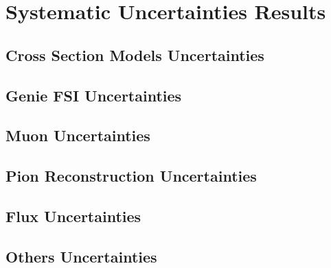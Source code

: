 \chapter{Systematic Uncertainties Results}
\label{Ap:Systematics}
 
\section{Cross Section Models Uncertainties}
\label{Ap:Systematics:CrosSectionModels}
\section{Genie FSI Uncertainties}
\label{Ap:Systematics:FSI}
\section{Muon Uncertainties}
\label{Ap:Systematics:Muon}
\section{Pion Reconstruction Uncertainties}
\label{Ap:Systematics:PionReconstruction}
\section{Flux Uncertainties}
\label{Ap:Systematics:Flux}
\section{Others Uncertainties}
\label{Ap:Systematics:Others}




